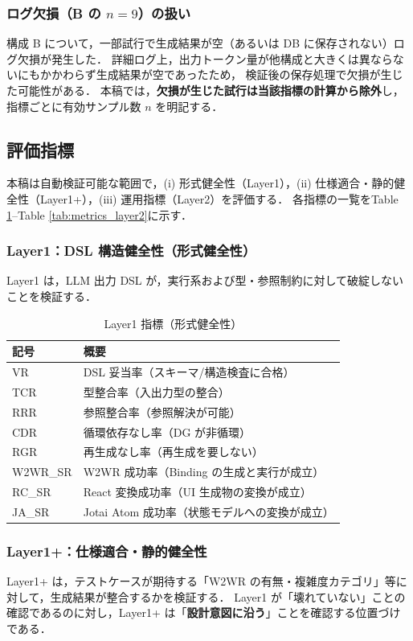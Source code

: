 \documentclass[a4paper,10pt]{jarticle}
\begin{document}
\subsubsection{ログ欠損（B の $n=9$）の扱い}
構成 B について，一部試行で生成結果が空（あるいは DB に保存されない）ログ欠損が発生した．
詳細ログ上，出力トークン量が他構成と大きくは異ならないにもかかわらず生成結果が空であったため，
検証後の保存処理で欠損が生じた可能性がある．
本稿では，\textbf{欠損が生じた試行は当該指標の計算から除外}し，指標ごとに有効サンプル数 $n$ を明記する．

\subsection{評価指標}
本稿は自動検証可能な範囲で，(i) 形式健全性（Layer1），(ii) 仕様適合・静的健全性（Layer1+），(iii) 運用指標（Layer2）を評価する．
各指標の一覧をTable \ref{tab:metrics_layer1}--Table \ref{tab:metrics_layer2}に示す．

\subsubsection{Layer1：DSL 構造健全性（形式健全性）}
Layer1 は，LLM 出力 DSL が，実行系および型・参照制約に対して破綻しないことを検証する．

\begin{table}[!t]
\centering
\caption{Layer1 指標（形式健全性）}
\label{tab:metrics_layer1}
\small
\begin{tabular}{ll} \toprule
記号 & 概要 \\ \midrule
VR & DSL 妥当率（スキーマ/構造検査に合格）\\
TCR & 型整合率（入出力型の整合）\\
RRR & 参照整合率（参照解決が可能）\\
CDR & 循環依存なし率（DG が非循環）\\
RGR & 再生成なし率（再生成を要しない）\\
W2WR\_SR & W2WR 成功率（Binding の生成と実行が成立）\\
RC\_SR & React 変換成功率（UI 生成物の変換が成立）\\
JA\_SR & Jotai Atom 成功率（状態モデルへの変換が成立）\\
\bottomrule
\end{tabular}
\end{table}

\subsubsection{Layer1+：仕様適合・静的健全性}
Layer1+ は，テストケースが期待する「W2WR の有無・複雑度カテゴリ」等に対して，生成結果が整合するかを検証する．
Layer1 が「壊れていない」ことの確認であるのに対し，Layer1+ は「\textbf{設計意図に沿う}」ことを確認する位置づけである．
\end{document}
